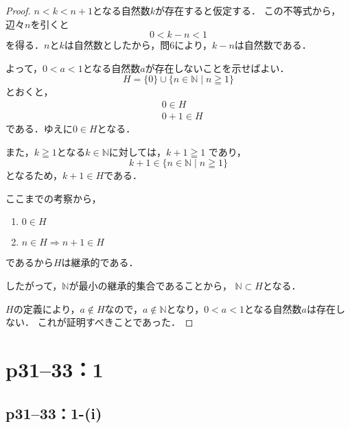 \documentclass[a4paper,10pt,fleqn]{ltjsarticle}
\begin{document}
\begin{tleftbar}
    \begin{proof}
        $n < k < n+1$となる自然数$k$が存在すると仮定する．
        この不等式から，辺々$n$を引くと
        \[
            0 < k - n < 1
        \]
        を得る．$n$と$k$は自然数としたから，問6により，$k-n$は自然数である．

        よって，$0<a<1$となる自然数$a$が存在しないことを示せばよい．
        \[
            H=\{0\} \cup \{n \in \mathbb{N} \mid n \geqq 1 \}
        \]
        とおくと，
        \begin{align*}
             & 0 \in H   \\
             & 0+1 \in H
        \end{align*}
        である．ゆえに$ 0 \in H$となる．

        また，$k \geqq 1$となる$k \in \mathbb{N}$に対しては，$k +1 \geqq 1$
        であり，
        \[
            k+1 \in \{n \in \mathbb{N} \mid n \geqq 1 \}
        \]
        となるため，$k+1 \in H$である．

        ここまでの考察から，
        \begin{enumerate}
            \item $0 \in H$
            \item $n \in H \Longrightarrow n+1 \in H$
        \end{enumerate}
        であるから$H$は継承的である．

        したがって，$\mathbb{N}$が最小の継承的集合であることから，
        $\mathbb{N} \subset H$となる．

        $H$の定義により，$a \notin H$なので，$a \notin \mathbb{N}$となり，$0<a<1$となる自然数$a$は存在しない．
        これが証明すべきことであった．
    \end{proof}
\end{tleftbar}

\newpage

\section*{p31--33：1}


\subsection*{p31--33：1-(i)}
\end{document}
